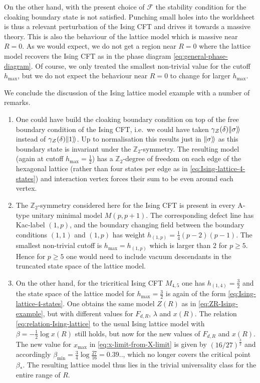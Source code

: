 \documentclass[11pt,a4paper]{article}
\numberwithin{equation}{section}
\def\ket#1{|{#1}\rangle}
\newcommand{\bndstate}[1]{|\hspace{-1pt}\ket{#1}\!\rangle}
\begin{document}
On the other hand, with the present choice of $\mathcal{F}$ the stability condition for the cloaking boundary state is not satisfied. Punching small holes into the worldsheet is thus a relevant perturbation of the Ising CFT and drives it towards a massive theory. This is also the behaviour of the lattice model which is massive near $R=0$. As we would expect, we do not get a region near $R=0$ where the lattice model recovers the Ising CFT as in the phase diagram \eqref{eq:general-phase-diagram}. Of course, we only treated the smallest non-trivial value for the cutoff $h_\text{max}$, but we do not expect the behaviour near $R=0$ to change for larger $h_\text{max}$.

\smallskip
We conclude the discussion of the Ising lattice model example with a number of remarks.
\begin{enumerate}
    \item 
    One
could have build the cloaking boundary condition on top of the free boundary condition of the Ising CFT, i.e.\ we could have taken $\gamma_{\mathcal{Z}}(\delta)\bndstate{\sigma}$ instead of $\gamma_{\mathcal{Z}}(\delta)\bndstate{1}$. Up to normalisation this results just in $\bndstate{\sigma}$ as this boundary state is invariant under the $\mathbb{Z}_2$-symmetry. The resulting model (again at cutoff $h_\text{max}=\frac12$) has a $\mathbb{Z}_2$-degree of freedom on each edge of the hexagonal lattice (rather than four states per edge as in \eqref{eq:Ising-lattice-4-states}) and interaction vertex forces their sum to be even around each vertex.

\item The $\mathbb{Z}_2$-symmetry considered here for the Ising CFT is present in every A-type unitary minimal model $M(p,p+1)$. The corresponding defect line has Kac-label $(1,p)$, and the boundary changing field between the boundary conditions $(1,1)$ and $(1,p)$ has weight $h_{(1,p)} = \frac14 (p-2)(p-1)$. The smallest non-trivial cutoff is $h_\text{max} = h_{(1,p)}$ which is larger than $2$ for $p \ge 5$. Hence for $p \ge 5$ one would need to include vacuum descendants in the truncated state space of the lattice model.

\item
On the other hand, for the tricritical Ising CFT $M_{4,5}$ one has $h_{(1,4)} = \frac32$ and the state space of the lattice model for $h_\text{max} = \frac32$ is again of the form \eqref{eq:Ising-lattice-4-states}.
One obtains the same model $Z(R)$ as in \eqref{eq:ZR-Ising-example}, but with different values for $F_{d,R}$, $\lambda$ and $x(R)$. The relation \eqref{eq:relation-Ising-lattice} to the usual Ising lattice model with $\beta = - \frac12 \log x(R)$
still holds, but now for the new values of $F_{d,R}$ and $x(R)$.
The new value for $x_\text{max}$ in \eqref{eq:x-limit-from-X-limit} is given by $(16/27)^{\frac32}$ and accordingly $\beta_\text{min} = \frac34 \log \frac{27}{16} = 0.39..$, which no longer covers the critical point $\beta_*$.
The resulting lattice model thus lies in the trivial universality class for the entire range of $R$.


\end{enumerate}
\end{document}

